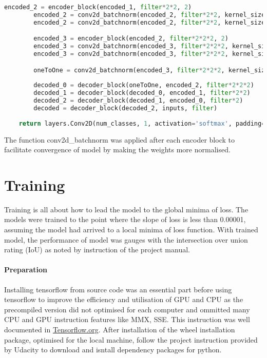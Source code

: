\documentclass[paper=a4, fontsize=11pt]{scrartcl} %
\numberwithin{equation}{section} %
\numberwithin{figure}{section} %
\numberwithin{table}{section} %
\begin{document}
\begin{enumerate}
\begin{itemize}
{\begin{lstlisting}[language=Python, caption=Fully convolutional network code]
		encoded_2 = encoder_block(encoded_1, filter*2*2, 2)
		encoded_2 = conv2d_batchnorm(encoded_2, filter*2*2, kernel_size=1, strides=1)
		encoded_2 = conv2d_batchnorm(encoded_2, filter*2*2, kernel_size=1, strides=1)

		encoded_3 = encoder_block(encoded_2, filter*2*2*2, 2)
		encoded_3 = conv2d_batchnorm(encoded_3, filter*2*2*2, kernel_size=1, strides=1)
		encoded_3 = conv2d_batchnorm(encoded_3, filter*2*2*2, kernel_size=1, strides=1)

		oneToOne = conv2d_batchnorm(encoded_3, filter*2*2*2, kernel_size=1, strides=1)
		
		decoded_0 = decoder_block(oneToOne, encoded_2, filter*2*2*2)
		decoded_1 = decoder_block(decoded_0, encoded_1, filter*2*2)
		decoded_2 = decoder_block(decoded_1, encoded_0, filter*2)
		decoded = decoder_block(decoded_2, inputs, filter)
    
    return layers.Conv2D(num_classes, 1, activation='softmax', padding='same')(decoded)
\end{lstlisting}

The function conv2d\_batchnorm was applied after each encoder block to facilitate convergence of model by making the weights more normalised.

\pagebreak
\section{Training}
Training is all about how to lead the model to the global minima of loss. The models were trained to the point where the slope of loss is less than 0.00001, assuming the model had arrived to a local minima of loss function. With trained model, the performance of model was gauges with the intersection over union rating (IoU) as noted by instruction of the project manual.
\paragraph{Preparation}
Installing tensorflow from source code was an essential part before using tensorflow to improve the efficiency and utilisation of GPU and CPU as the precompiled version did not optimised for each computer and ommitted many CPU and GPU instruction features like MMX, SSE\@. This instruction was well documented in \href{http://www.tensorflow.org/install/install_sources}{Tensorflow.org}. After installation of the wheel installation package, optimised for the local machine, follow the project instruction provided by Udacity to download and isntall dependency packages for python.
}
\end{itemize}
\end{enumerate}
\end{document}
